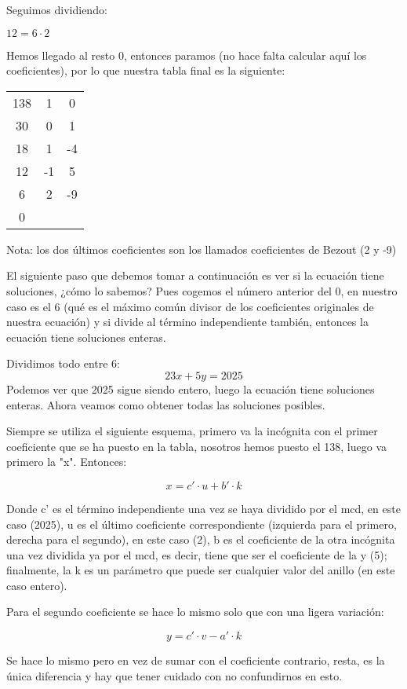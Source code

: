 \documentclass[11pt, a4paper, titlepage]{article}
\begin{document}
Seguimos dividiendo:

$ 12 = 6 \cdot 2 $

Hemos llegado al resto 0, entonces paramos (no hace falta calcular aquí los coeficientes), por lo que
nuestra tabla final es la siguiente:


\begin{center}
\begin{tabular}{c|cc}
138 & 1 & 0 \\
30 & 0 & 1 \\
\hline
18 & 1 & -4 \\
\hline
12 & -1 & 5 \\
\hline
6 & 2 & -9 \\
\hline
0
\end{tabular}
\end{center}


Nota: los dos últimos coeficientes son los llamados coeficientes de Bezout (2 y -9)

El siguiente paso que debemos tomar a continuación es ver si la ecuación tiene soluciones, ¿cómo lo sabemos? Pues cogemos el número anterior del 0, en nuestro caso es el 6 (qué es el máximo común divisor de  los coeficientes originales de nuestra ecuación) y si divide al término independiente también, entonces la ecuación tiene soluciones enteras.

Dividimos todo entre 6:
$$ 23x + 5y = 2025 $$
Podemos ver que 2025 sigue siendo entero, luego la ecuación tiene soluciones enteras. Ahora veamos como
obtener todas las soluciones posibles.

Siempre se utiliza el siguiente esquema, primero va la incógnita con el primer coeficiente que se ha puesto en la tabla, nosotros hemos puesto el 138, luego va primero la "x". Entonces:

$$ x = c' \cdot u + b' \cdot k $$

Donde c' es el término independiente una vez se haya dividido por el mcd, en este caso (2025), u es el último coeficiente correspondiente (izquierda para el primero, derecha para el segundo), en este caso (2), b es el coeficiente de la otra incógnita una vez dividida ya por el mcd, es decir, tiene que ser el coeficiente de la y (5); finalmente, la k es un parámetro que puede ser cualquier valor del anillo (en este caso entero).

Para el segundo coeficiente se hace lo mismo solo que con una ligera variación:

$$ y = c' \cdot v - a' \cdot k $$

Se hace lo mismo pero en vez de sumar con el coeficiente contrario, resta, es la única diferencia y hay que tener cuidado con no confundirnos en esto.
\end{document}
